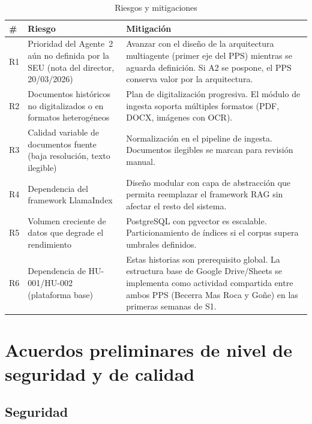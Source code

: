 \documentclass[a4paper, 12pt]{article}
\begin{document}
\begin{table}[htbp]
  \centering
  \caption{Riesgos y mitigaciones}
  \label{tab:riesgos}
  \begin{tabularx}{\textwidth}{l>{\raggedright\arraybackslash}X>{\raggedright\arraybackslash}X}
    \toprule
    \textbf{\#} & \textbf{Riesgo} & \textbf{Mitigaci\'on} \\
    \midrule
    R1 & Prioridad del Agente~2 a\'un no definida por la \ac{SEU} (nota del director, 20/03/2026) & Avanzar con el dise\~no de la arquitectura multiagente (primer eje del PPS) mientras se aguarda definici\'on. Si A2 se pospone, el PPS conserva valor por la arquitectura. \\
    R2 & Documentos hist\'oricos no digitalizados o en formatos heterog\'eneos & Plan de digitalizaci\'on progresiva. El m\'odulo de ingesta soporta m\'ultiples formatos (PDF, DOCX, im\'agenes con OCR). \\
    R3 & Calidad variable de documentos fuente (baja resoluci\'on, texto ilegible) & Normalizaci\'on en el pipeline de ingesta. Documentos ilegibles se marcan para revisi\'on manual. \\
    R4 & Dependencia del framework LlamaIndex & Dise\~no modular con capa de abstracci\'on que permita reemplazar el framework RAG sin afectar el resto del sistema. \\
    R5 & Volumen creciente de datos que degrade el rendimiento & PostgreSQL con pgvector es escalable. Particionamiento de \'indices si el corpus supera umbrales definidos. \\
    R6 & Dependencia de HU-001/HU-002 (plataforma base) & Estas historias son prerequisito global. La estructura base de Google Drive/Sheets se implementa como actividad compartida entre ambos PPS (Becerra Mas Roca y Go\~ne) en las primeras semanas de S1. \\
    \bottomrule
  \end{tabularx}
\end{table}

\section{Acuerdos preliminares de nivel de seguridad y de calidad}

\subsection{Seguridad}
\end{document}

